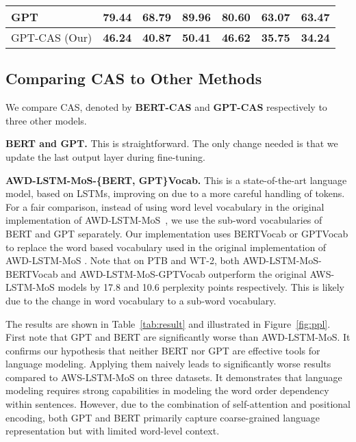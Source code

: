 \documentclass[11pt,a4paper]{article}
\begin{document}
\begin{table*}[t!]
\begin{tabular}{|l|l|l|l|l|l|l|}
GPT                                       & 79.44                             & 68.79                              & 89.96                             & 80.60                              & 63.07                             & 63.47                              \\ \hline
GPT-CAS (Our)                           & \textbf{46.24}                    & \textbf{40.87}                     & \textbf{50.41}                    & \textbf{46.62}                     & \textbf{35.75}                    & \textbf{34.24}                         \\ \hline
\end{tabular}
\caption{Performance of Coordinate Architecture Search (CAS). `Val' and `Test' denote validation and test perplexity respectively.}
\label{tab:result}
\end{table*}

\subsection{Comparing CAS to Other Methods}

We compare CAS, denoted by \textbf{BERT-CAS} and \textbf{GPT-CAS} respectively to three other models. 

{\bfseries BERT and GPT.} This is straightforward. The only change needed is that we update the last output layer during fine-tuning. 

{\bfseries AWD-LSTM-MoS-\{BERT, GPT\}Vocab.}  This is a state-of-the-art
language model, based on LSTMs, improving on \cite{Yang03953} due to a
more careful handling of tokens. For a fair comparison, instead of using word level vocabulary in the original implementation of AWD-LSTM-MoS~\cite{Yang03953}, we use the sub-word vocabularies of BERT and GPT separately. Our implementation uses
BERTVocab or GPTVocab to replace the word based vocabulary used in
the original implementation of AWD-LSTM-MoS \cite{Yang03953}. Note
that on PTB and WT-2, both AWD-LSTM-MoS-BERTVocab and
AWD-LSTM-MoS-GPTVocab outperform the original AWS-LSTM-MoS models by
17.8 and 10.6 perplexity points respectively. This is likely due to
the change in word vocabulary to a sub-word vocabulary.

The results are shown in Table~\ref{tab:result} and illustrated in
Figure~\ref{fig:ppl}. First note that GPT and BERT are significantly
worse than AWD-LSTM-MoS. It confirms our hypothesis that neither BERT
nor GPT are effective tools for language modeling. Applying them
naively leads to significantly worse results compared to AWS-LSTM-MoS
on three datasets. It demonstrates that language modeling requires
strong capabilities in modeling the word order dependency within
sentences. However, due to the combination of self-attention and
positional encoding, both GPT and BERT primarily capture
coarse-grained language representation but with limited word-level
context.
\end{document}
